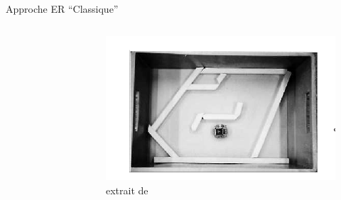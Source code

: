 \documentclass[8pt]{beamer}
\begin{document}
\begin{frame}{Approche ER ``Classique''}
\begin{columns}
\begin{figure}
		\end{figure}
		\begin{figure}
			\centering
			\includegraphics[width=.9\textwidth]{images/oldERfloreano}
			\caption{extrait de \cite{floreano94automaticcreationofanautonomousagen}}\label{fig:oldEr}
		\end{figure}
	\end{columns}

\end{frame}
\end{document}
